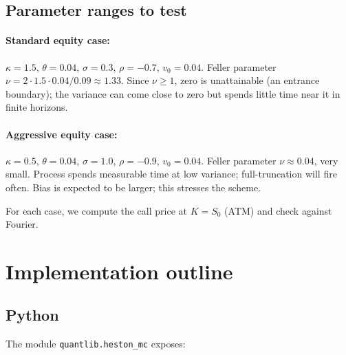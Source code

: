\documentclass[11pt]{article}
\theoremstyle{plain}
\theoremstyle{definition}
\theoremstyle{remark}
\begin{document}
\subsection{Parameter ranges to test}

\paragraph{Standard equity case:} $\kappa = 1.5$, $\theta = 0.04$, $\sigma = 0.3$, $\rho = -0.7$, $v_0 = 0.04$. Feller parameter $\nu = 2 \cdot 1.5 \cdot 0.04 / 0.09 \approx 1.33$. Since $\nu \geq 1$, zero is unattainable (an entrance boundary); the variance can come close to zero but spends little time near it in finite horizons.

\paragraph{Aggressive equity case:} $\kappa = 0.5$, $\theta = 0.04$, $\sigma = 1.0$, $\rho = -0.9$, $v_0 = 0.04$. Feller parameter $\nu \approx 0.04$, very small. Process spends measurable time at low variance; full-truncation will fire often. Bias is expected to be larger; this stresses the scheme.

For each case, we compute the call price at $K = S_0$ (ATM) and check against Fourier.

\section{Implementation outline}

\subsection{Python}

The module \texttt{quantlib.heston\_mc} exposes:
\end{document}
